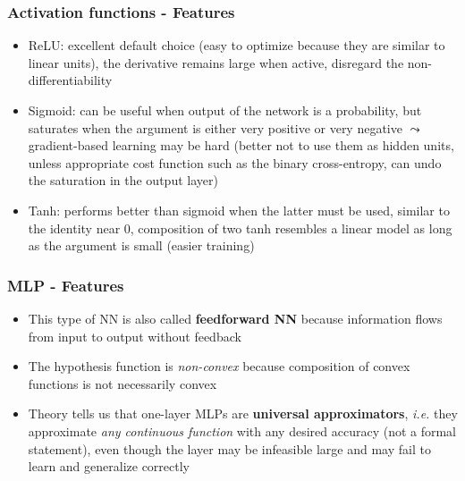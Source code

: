 \documentclass{beamer}
\begin{document}
\begin{frame}
\begin{figure}
			\qquad
		\end{figure}
	\end{frame}
	
	\begin{frame}
		\frametitle{Activation functions - Features}
		\begin{itemize}
			\item ReLU: excellent default choice (easy to optimize because they are similar to linear units), the derivative remains large when active,  disregard the non-differentiability
			\item Sigmoid: can be useful when output of the network is a probability, but saturates when the argument is either very positive or very negative $\leadsto$ gradient-based learning may be hard (better not to use them as hidden units, unless appropriate cost function such as the binary cross-entropy, can undo the saturation in the output layer)
			\item Tanh: performs better than sigmoid when the latter must be used, similar to the identity near 0, composition of two tanh resembles a linear model as long as the argument is small (easier training)
		\end{itemize}
	\end{frame}

	\begin{frame}
	\frametitle{MLP - Features}
	\begin{itemize}
		\setlength\itemsep{5mm}
		\item This type of NN is also called \textbf{feedforward NN} because information flows from input to output without feedback
		\item The hypothesis function is \textit{non-convex} because composition of convex functions is not necessarily convex
		\item Theory tells us that one-layer MLPs are \textbf{universal approximators}, \textit{i.e.} they approximate \textit{any continuous function} with any desired accuracy (not a formal statement), even though the layer may be infeasible large and may fail to learn and generalize correctly
	\end{itemize}
\end{frame}
\end{document}
